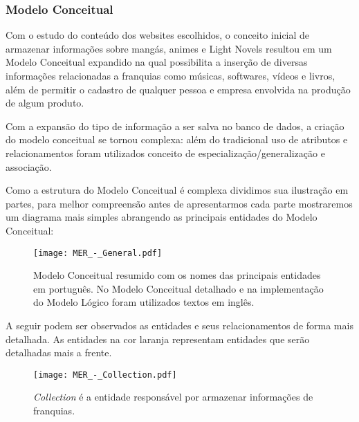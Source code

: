 \documentclass[12pt]{article}
\begin{document}

\subsubsection{Modelo Conceitual}

Com o estudo do conteúdo dos websites escolhidos, o conceito inicial de armazenar informações sobre mangás, animes e Light Novels resultou em um Modelo Conceitual expandido na qual possibilita a inserção de diversas informações relacionadas a franquias como músicas, softwares, vídeos e livros, além de permitir o cadastro de qualquer pessoa e empresa envolvida na produção de algum produto.

Com a expansão do tipo de informação a ser salva no banco de dados, a criação do modelo conceitual se tornou complexa: além do tradicional uso de atributos e relacionamentos foram utilizados conceito de especialização/generalização e associação. 

Como a estrutura do Modelo Conceitual é complexa dividimos sua ilustração em partes, para melhor compreensão antes de apresentarmos cada parte mostraremos um diagrama mais simples abrangendo as principais entidades do Modelo Conceitual:

\begin{figure}[H]
\centering
\texttt{[image: MER\_-\_General.pdf]}
\caption{Modelo Conceitual resumido com os nomes das principais entidades em português. No Modelo Conceitual detalhado e na implementação do Modelo Lógico foram utilizados textos em inglês.} \label{collection}
\end{figure}

A seguir podem ser observados as entidades e seus relacionamentos de forma mais detalhada. As entidades na cor laranja representam entidades que serão detalhadas mais a frente.
\begin{figure}[H]
\centering
\texttt{[image: MER\_-\_Collection.pdf]}
\caption{\textit{Collection} é a entidade responsável por armazenar informações de franquias.} \label{collection}
\end{figure}
\end{document}
